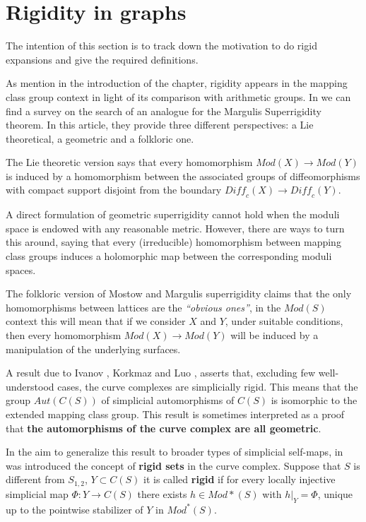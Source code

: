 \section{Rigidity in graphs}

The intention of this section is to track down the motivation to do rigid expansions and give the required definitions.

As mention in the introduction of the chapter, rigidity appears in the mapping class group context in light of its comparison with arithmetic groups. In \cite[Aramayona, S.]{rigidityJA} we can find a survey on the search of an analogue for the Margulis Superrigidity theorem. In this article, they provide three different perspectives: a Lie theoretical, a geometric and a folkloric one.

The Lie theoretic version says that every homomorphism $Mod(X) \to Mod(Y)$ is induced by a homomorphism between the associated groups of diffeomorphisms with compact support disjoint from the boundary $\textit{Diff}_{c}(X) \to \textit{Diff}_{c}(Y)$.

A direct formulation of geometric superrigidity cannot hold when the moduli space is endowed with any reasonable metric. However, there are ways to turn this around, saying that every (irreducible) homomorphism between mapping class groups induces a holomorphic map between the corresponding moduli spaces.

The folkloric version of Mostow and Margulis superrigidity claims that the only homomorphisms between lattices are the \textit{“obvious ones”}, in the $Mod(S)$ context this will mean that if we consider $X$ and $Y$, under suitable conditions, then every homomorphism $Mod(X) \to Mod(Y)$ will be induced by a manipulation of the underlying surfaces. 

A result due to Ivanov \cite{celebratedIvanov}, Korkmaz \cite{celebratedKorkmaz} and Luo \cite{celebratedLuo}, asserts that, excluding few well-understood cases, the curve complexes are simplicially rigid. This means that the group $Aut(C(S))$ of simplicial automorphisms of $C(S)$ is isomorphic to the extended mapping class group. This result is sometimes interpreted as a proof that \textbf{the automorphisms  of  the  curve  complex  are  all geometric}.

In the aim to generalize this result to broader types of simplicial self-maps, in \cite[Aramayona, Leininger - 13]{finiteRigidSetsJA} was introduced the concept of \textbf{rigid sets} in the curve complex. Suppose that $S$ is different from $S_{1,2}$,  $Y \subset C(S)$ it is called \textbf{rigid} if for every locally injective simplicial map $\Phi  : Y \to C(S)$ there exists $h \in Mod{\ast}(S)$ with $h|_{Y} = \Phi$, unique up to the pointwise stabilizer of $Y$ in $Mod^{\ast}(S)$.

